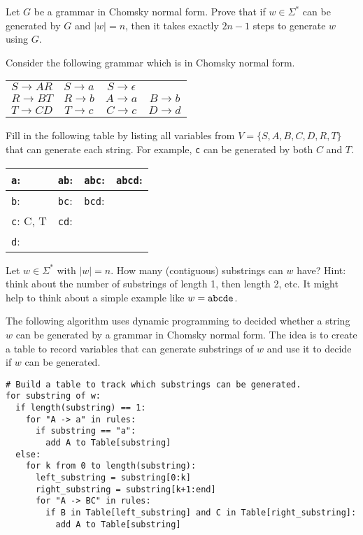 \documentclass[11pt]{exam}
\begin{document}
\begin{questions}
\question Let $G$ be a grammar in Chomsky normal form. Prove that if $w \in \Sigma^*$ can be generated by $G$ and $|w| = n$, then it takes exactly $2n-1$ steps to generate $w$ using $G$. 
\vfill

\question Consider the following grammar which is in Chomsky normal form.
\begin{center}
\begin{tabular}{cccc}
$S \rightarrow AR$ & $S \rightarrow a$ & $S \rightarrow \epsilon$ & \\
$R \rightarrow BT$ & $R \rightarrow b$ & $A \rightarrow a$ & $B \rightarrow b$ \\
$T \rightarrow CD$ & $T \rightarrow c$ & $C \rightarrow c$ & $D \rightarrow d$
\end{tabular}
\end{center}
Fill in the following table by listing all variables from $V = \{S, A, B, C, D, R, T\}$ that can generate each string. For example, \verb|c| can be generated by both $C$ and $T$.   
\begin{center}
\begin{tabular}{|l|l|l|l|}
\hline
\verb|a|: \hspace*{0.75in} & \verb|ab|: \hspace*{0.75in}  & \verb|abc|: \hspace*{0.75in} & \verb|abcd|: \hspace*{0.75in} \\ \hline
\verb|b|:  & \verb|bc|: & \verb|bcd|: &  \\ \hline
\verb|c|:  C, T & \verb|cd|:  & & \\ \hline
\verb|d|:  & & & \\ \hline
\end{tabular}
\end{center}
\bigskip

\question Let $w \in \Sigma^*$ with $|w|=n$. How many (contiguous) substrings can $w$ have?  Hint: think about the number of substrings of length 1, then length 2, etc.  It might help to think about a simple example like $w = \verb|abcde|$. 
\vfill



\newpage
\question The following algorithm uses dynamic programming to decided whether a string $w$ can be generated by a grammar in Chomsky normal form. The idea is to create a table to record variables that can generate substrings of $w$ and use it to decide if $w$ can be generated.
\begin{tcolorbox}
\begin{verbatim}
# Build a table to track which substrings can be generated.
for substring of w: 
  if length(substring) == 1:
    for "A -> a" in rules:
      if substring == "a":
        add A to Table[substring]
  else:
    for k from 0 to length(substring):
      left_substring = substring[0:k]
      right_substring = substring[k+1:end]
      for "A -> BC" in rules:
        if B in Table[left_substring] and C in Table[right_substring]:
          add A to Table[substring]


\end{verbatim}
\end{tcolorbox}
\end{questions}
\end{document}
